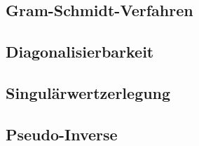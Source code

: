 \subsubsection*{}


\subsection{Gram-Schmidt-Verfahren}

\subsection{Diagonalisierbarkeit}

\subsection{Singulärwertzerlegung}

\subsection{Pseudo-Inverse}